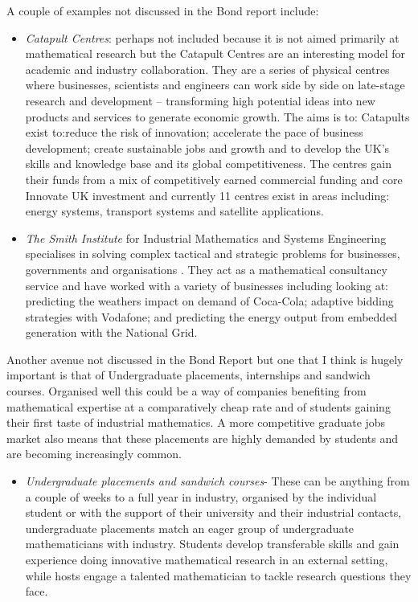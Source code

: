 \documentclass[11pt]{article} %
\begin{document}
A couple of examples not discussed in the Bond report include:
\begin{itemize}
	\item \textit{Catapult Centres}: perhaps not included because it is not aimed primarily at mathematical research but the Catapult Centres are an interesting model for academic and industry collaboration. They are a series of physical centres where  businesses, scientists and engineers can work side by side on late-stage research and development – transforming high potential ideas into new products and services to generate economic growth.  The aims is to:  Catapults exist to:reduce the risk of innovation; 	accelerate the pace of business development;  create sustainable jobs and growth and to	develop the UK's skills and knowledge base and its global competitiveness. The centres gain their funds from a mix of competitively earned commercial funding and core Innovate UK investment and currently 11 centres exist in areas including: energy systems, transport systems and satellite applications. 
	\item \textit{The Smith Institute} for Industrial Mathematics and Systems Engineering specialises in solving complex tactical and strategic problems for businesses, governments and organisations \cite{Smith}. They act as a mathematical consultancy service and have worked with a variety of businesses including looking at:  predicting the weathers impact on demand of Coca-Cola; adaptive bidding strategies with Vodafone; and predicting the energy output from embedded generation with the National Grid. 
\end{itemize}
Another avenue not discussed in the Bond Report but one that I think is hugely important is that of Undergraduate placements, internships and sandwich courses. Organised well this could be a way of companies benefiting from mathematical expertise at a comparatively cheap rate and of students gaining their first taste of industrial mathematics. A more competitive graduate jobs market also means that these placements are highly demanded by students and are becoming increasingly common. 
\begin{itemize}
	\item \textit{Undergraduate placements and sandwich courses}- These can be anything from a couple of weeks to a full year in industry, organised by the individual student or with the support of their university and their industrial contacts, undergraduate placements match an eager group of undergraduate mathematicians with industry. Students develop transferable skills and gain experience doing innovative mathematical research in an external setting, while hosts engage a talented mathematician to tackle research questions they face.
\end{itemize}
\end{document}
